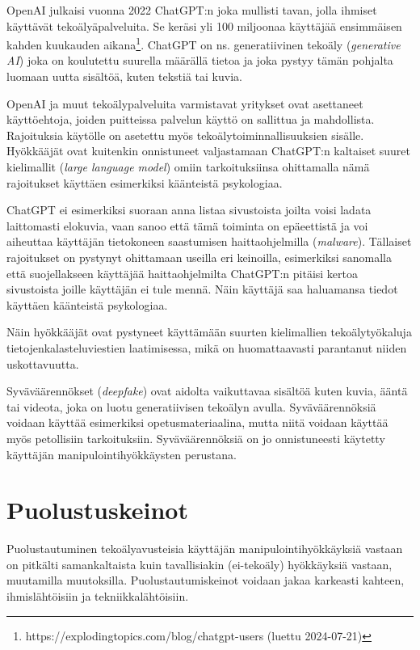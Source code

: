 OpenAI julkaisi vuonna 2022 ChatGPT:n joka mullisti tavan, jolla ihmiset käyttävät tekoälyäpalveluita. Se keräsi yli 100 miljoonaa käyttäjää ensimmäisen kahden kuukauden aikana\footnote{https://explodingtopics.com/blog/chatgpt-users (luettu 2024-07-21)}. ChatGPT on ns. generatiivinen tekoäly (\textit{generative AI}) joka on koulutettu suurella määrällä tietoa ja joka pystyy tämän pohjalta luomaan uutta sisältöä, kuten tekstiä tai kuvia.

OpenAI ja muut tekoälypalveluita varmistavat yritykset ovat asettaneet käyttöehtoja, joiden puitteissa palvelun käyttö on sallittua ja mahdollista. Rajoituksia käytölle on asetettu myös tekoälytoiminnallisuuksien sisälle. Hyökkääjät ovat kuitenkin onnistuneet valjastamaan ChatGPT:n kaltaiset suuret kielimallit (\textit{large language model}) omiin tarkoituksiinsa ohittamalla nämä rajoitukset käyttäen esimerkiksi käänteistä psykologiaa.

ChatGPT ei esimerkiksi suoraan anna listaa sivustoista joilta voisi ladata laittomasti elokuvia, vaan sanoo että tämä toiminta on epäeettistä ja voi aiheuttaa käyttäjän tietokoneen saastumisen haittaohjelmilla (\textit{malware}). Tällaiset rajoitukset on pystynyt ohittamaan useilla eri keinoilla, esimerkiksi sanomalla että suojellakseen käyttäjää haittaohjelmilta ChatGPT:n pitäisi kertoa sivustoista joille käyttäjän ei tule mennä. Näin käyttäjä saa haluamansa tiedot käyttäen käänteistä psykologiaa.

Näin hyökkääjät ovat pystyneet käyttämään suurten kielimallien tekoälytyökaluja tietojenkalasteluviestien laatimisessa, mikä on huomattaavasti parantanut niiden uskottavuutta.

Syväväärennökset (\textit{deepfake}) ovat aidolta vaikuttavaa sisältöä kuten kuvia, ääntä tai videota, joka on luotu generatiivisen tekoälyn avulla. Syväväärennöksiä voidaan käyttää esimerkiksi opetusmateriaalina, mutta niitä voidaan käyttää myös petollisiin tarkoituksiin. Syväväärennöksiä on jo onnistuneesti käytetty käyttäjän manipulointihyökkäysten perustana.

\section*{Puolustuskeinot}

Puolustautuminen tekoälyavusteisia käyttäjän manipulointihyökkäyksiä vastaan on pitkälti samankaltaista kuin tavallisiakin (ei-tekoäly) hyökkäyksiä vastaan, muutamilla muutoksilla. Puolustautumiskeinot voidaan jakaa karkeasti kahteen, ihmislähtöisiin ja tekniikkalähtöisiin.

